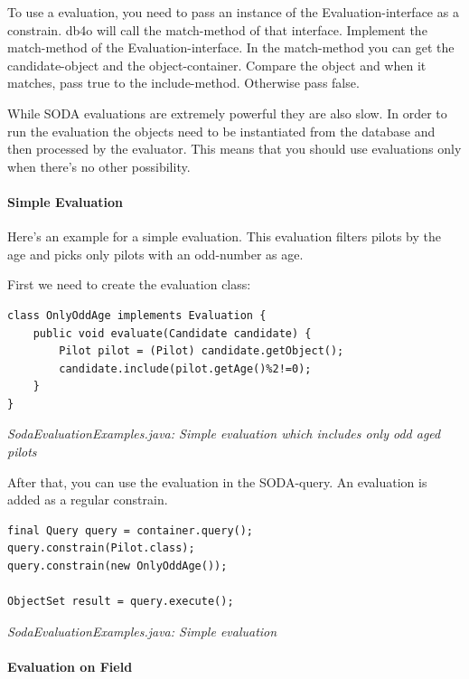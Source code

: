 To use a evaluation, you need to pass an instance of the Evaluation-interface as a constrain. db4o will call the match-method of that interface. Implement the match-method of the Evaluation-interface. In the match-method you can get the candidate-object and the object-container. Compare the object and when it matches, pass true to the include-method. Otherwise pass false.

While SODA evaluations are extremely powerful they are also slow. In order to run the evaluation the objects need to be instantiated from the database and then processed by the evaluator. This means that you should use evaluations only when there's no other possibility.

\paragraph{Simple Evaluation}
\label{ref:basics-querying-soda-soda-evaluations:simpleevaluation}

Here's an example for a simple evaluation. This evaluation filters pilots by the age and picks only pilots with an odd-number as age.

First we need to create the evaluation class:

\begin{lstlisting}
class OnlyOddAge implements Evaluation {
    public void evaluate(Candidate candidate) {
        Pilot pilot = (Pilot) candidate.getObject();
        candidate.include(pilot.getAge()%2!=0);
    }
}
\end{lstlisting}

{\small\itshape SodaEvaluationExamples.java: Simple evaluation which includes only odd aged pilots\par}
\medskip

After that, you can use the evaluation in the SODA-query. An evaluation is added as a regular constrain.

\begin{lstlisting}
final Query query = container.query();
query.constrain(Pilot.class);
query.constrain(new OnlyOddAge());

ObjectSet result = query.execute();
\end{lstlisting}

{\small\itshape SodaEvaluationExamples.java: Simple evaluation\par}
\medskip

\paragraph{Evaluation on Field}
\label{ref:basics-querying-soda-soda-evaluations:evaluationonfield}

